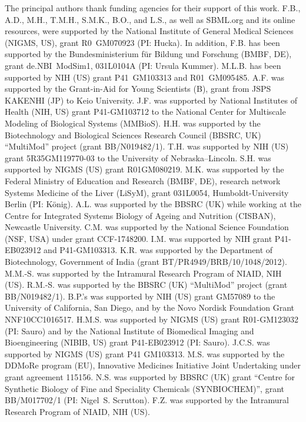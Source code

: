 \documentclass{sbml-paper}
\begin{document}
The principal authors thank funding agencies for their support of this work.
F.B., A.D., M.H., T.M.H., S.M.K., B.O., and L.S., as well as SBML.org and its online resources, were supported by the National Institute of General Medical Sciences (NIGMS, US), grant \No R0~GM070923 (PI: Hucka).
In addition, F.B. has been supported by the Bundesministerium f\"{u}r Bildung und Forschung (BMBF, DE), grant \No de.NBI~ModSim1, 031L0104A (PI: Ursula Kummer).
M.L.B. has been supported by NIH (US) grant \No P41~GM103313 and R01~GM095485.
A.F. was supported by the Grant-in-Aid for Young Scientists (B), grant  from JSPS KAKENHI (JP) to Keio University.
J.F. was supported by National Institutes of Health (NIH, US) grant \No P41-GM103712 to the National Center for Multiscale Modeling of Biological Systems (MMBioS).
H.H. was supported by the Biotechnology and Biological Sciences Research Council (BBSRC, UK) ``MultiMod'' project (grant \No BB/N019482/1).
T.H. was supported by NIH (US) grant \No 5R35GM119770-03 to the University of Nebraska--Lincoln.
S.H. was supported by NIGMS (US) grant \No R01GM080219.
M.K. was supported by the Federal Ministry of Education and Research (BMBF, DE), research network Systems Medicine of the Liver (LiSyM), grant \No 031L0054, Humboldt-University Berlin (PI: K\"{o}nig).
A.L. was supported by the BBSRC (UK) while working at the Centre for Integrated Systems Biology of Ageing and Nutrition (CISBAN), Newcastle University.
C.M. was supported by the National Science Foundation (NSF, USA) under grant \No CCF-1748200.
I.M. was supported by NIH grant \No P41-EB023912 and P41-GM103313.
K.R. was supported by the Department of Biotechnology, Government of India (grant \No BT/PR4949/BRB/10/1048/2012).
M.M.-S. was supported by the Intramural Research Program of NIAID, NIH (US).
R.M.-S. was supported by the BBSRC (UK) ``MultiMod'' project (grant \No BB/N019482/1).
B.P.'s was supported by NIH (US) grant \No GM57089 to the University of California, San Diego, and by the Novo Nordisk Foundation Grant \No NNF10CC1016517.
H.M.S. was supported by NIGMS (US) grant \No R01-GM123032 (PI: Sauro) and by the National Institute of Biomedical Imaging and Bioengineering (NIBIB, US) grant \No P41-EB023912 (PI: Sauro).
J.C.S. was supported by NIGMS (US) grant P41 GM103313.
M.S. was supported by the DDMoRe program (EU), Innovative Medicines Initiative Joint Undertaking under grant agreement 115156.
N.S. was supported by BBSRC (UK) grant ``Centre for Synthetic Biology of Fine and Speciality Chemicals (SYNBIOCHEM)'', grant \No BB/M017702/1 (PI: Nigel~S. Scrutton).
F.Z. was supported by the Intramural Research Program of NIAID, NIH (US).
\end{document}

